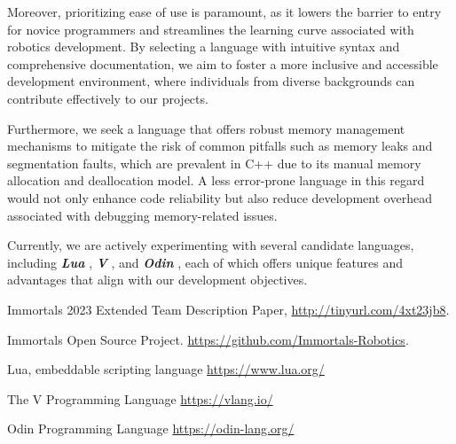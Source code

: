 \documentclass[runningheads]{llncs}
\begin{document}
Moreover, prioritizing ease of use is paramount, as it lowers the barrier to entry for novice programmers and streamlines the learning curve associated with robotics development. By selecting a language with intuitive syntax and comprehensive documentation, we aim to foster a more inclusive and accessible development environment, where individuals from diverse backgrounds can contribute effectively to our projects.

Furthermore, we seek a language that offers robust memory management mechanisms to mitigate the risk of common pitfalls such as memory leaks and segmentation faults, which are prevalent in C++ due to its manual memory allocation and deallocation model. A less error-prone language in this regard would not only enhance code reliability but also reduce development overhead associated with debugging memory-related issues.

Currently, we are actively experimenting with several candidate languages, including \textbf{\textit{Lua}} \cite{ref_3rd-lua}, \textbf{\textit{V}} \cite{ref_3rd-v-lang}, and \textbf{\textit{Odin}} \cite{ref_3rd-odin}, each of which offers unique features and advantages that align with our development objectives.

\newpage
\begin{thebibliography}{8}

Immortals 2023 Extended Team Description Paper, \url{http://tinyurl.com/4xt23jb8}.

Immortals Open Source Project. \url{https://github.com/Immortals-Robotics}.

Lua, embeddable scripting language \url{https://www.lua.org/}

The V Programming Language \url{https://vlang.io/}

Odin Programming Language \url{https://odin-lang.org/}

\end{thebibliography}
\end{document}
